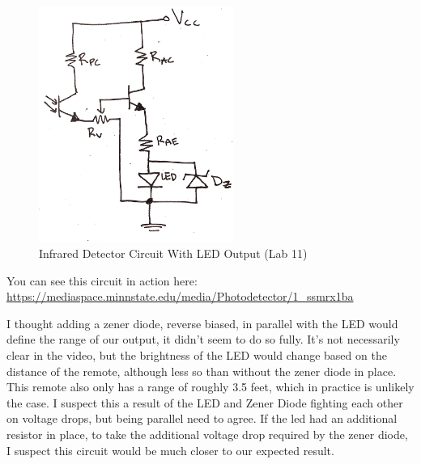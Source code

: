 \documentclass[prb,preprint]{revtex4-1}
\begin{document}
\begin{figure}[ht]
	\centering
	\includegraphics[width=2.5in]{c11.png}
	\caption{Infrared Detector Circuit With LED Output (Lab 11)}
	\label{fig1}
\end{figure}


You can see this circuit in action here: \url{https://mediaspace.minnstate.edu/media/Photodetector/1_ssmrx1ba}

I thought adding a zener diode, reverse biased, in parallel with the LED would define the range of our output, it didn't seem to do so fully. It's not necessarily clear in the video, but the brightness of the LED would change based on the distance of the remote, although less so than without the zener diode in place. This remote also only has a range of roughly 3.5 feet, which in practice is unlikely the case. I suspect this a result of the LED and Zener Diode fighting each other on voltage drops, but being parallel need to agree. If the led had an additional resistor in place, to take the additional voltage drop required by the zener diode, I suspect this circuit would be much closer to our expected result.


\end{document}
